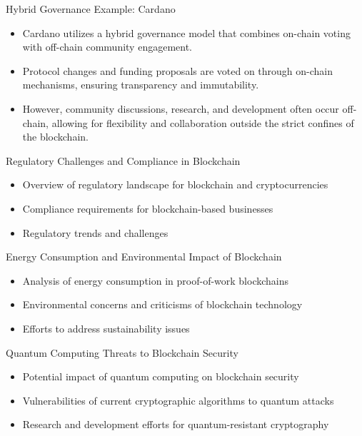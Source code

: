 \begin{frame}{Hybrid Governance Example: Cardano}
    \begin{itemize}
        \item Cardano utilizes a hybrid governance model that combines on-chain voting with off-chain community engagement.
        \item Protocol changes and funding proposals are voted on through on-chain mechanisms, ensuring transparency and immutability.
        \item However, community discussions, research, and development often occur off-chain, allowing for flexibility and collaboration outside the strict confines of the blockchain.
    \end{itemize}
\end{frame}

\begin{frame}{Regulatory Challenges and Compliance in Blockchain}
    \begin{itemize}
        \item Overview of regulatory landscape for blockchain and cryptocurrencies
        \item Compliance requirements for blockchain-based businesses
        \item Regulatory trends and challenges
    \end{itemize}
\end{frame}

\begin{frame}{Energy Consumption and Environmental Impact of Blockchain}
    \begin{itemize}
        \item Analysis of energy consumption in proof-of-work blockchains
        \item Environmental concerns and criticisms of blockchain technology
        \item Efforts to address sustainability issues
    \end{itemize}
\end{frame}

\begin{frame}{Quantum Computing Threats to Blockchain Security}
    \begin{itemize}
        \item Potential impact of quantum computing on blockchain security
        \item Vulnerabilities of current cryptographic algorithms to quantum attacks
        \item Research and development efforts for quantum-resistant cryptography
    \end{itemize}
\end{frame}

